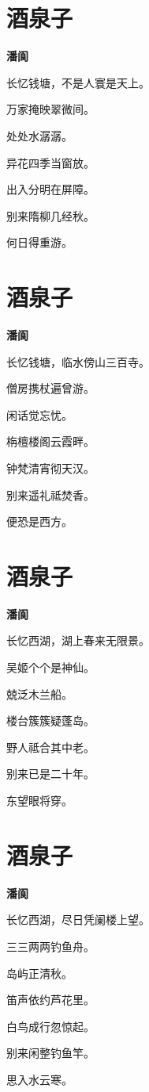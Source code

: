 \documentclass[12pt,a4paper]{ctexbook}
\begin{document}
\section{酒泉子}
\textbf{潘阆}\par\vspace{0.5em}
长忆钱塘，不是人寰是天上。\par
万家掩映翠微间。\par
处处水潺潺。\par
异花四季当窗放。\par
出入分明在屏障。\par
别来隋柳几经秋。\par
何日得重游。\par

\section{酒泉子}
\textbf{潘阆}\par\vspace{0.5em}
长忆钱塘，临水傍山三百寺。\par
僧房携杖遍曾游。\par
闲话觉忘忧。\par
栴檀楼阁云霞畔。\par
钟梵清宵彻天汉。\par
别来遥礼祗焚香。\par
便恐是西方。\par

\section{酒泉子}
\textbf{潘阆}\par\vspace{0.5em}
长忆西湖，湖上春来无限景。\par
吴姬个个是神仙。\par
兢泛木兰船。\par
楼台簇簇疑蓬岛。\par
野人祗合其中老。\par
别来已是二十年。\par
东望眼将穿。\par

\section{酒泉子}
\textbf{潘阆}\par\vspace{0.5em}
长忆西湖，尽日凭阑楼上望。\par
三三两两钓鱼舟。\par
岛屿正清秋。\par
笛声依约芦花里。\par
白鸟成行忽惊起。\par
别来闲整钓鱼竿。\par
思入水云寒。\par
\end{document}

